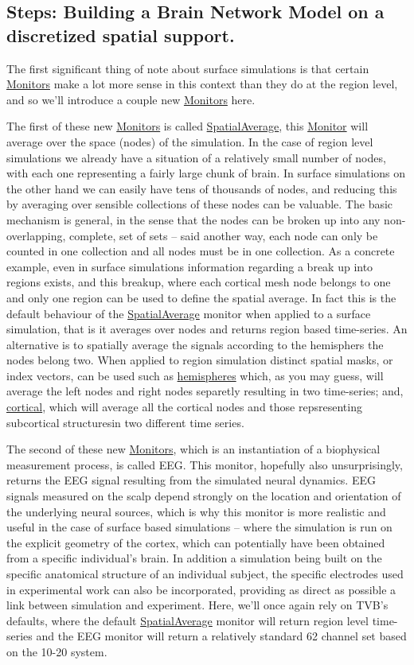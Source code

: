 \documentclass{tufte-handout}
\begin{document}
\subsection{Steps: Building a Brain Network Model on a discretized spatial support.}\label{sec:steps}

The first significant thing of note about surface simulations is that certain \underline{Monitors} make a lot more sense in this context than they do at the region level, and so we'll introduce a couple new \underline{Monitors} here.

The first of these new \underline{Monitors} is called
\underline{SpatialAverage}, this \underline{Monitor} will average over the
space (nodes) of the simulation. In the case of region level simulations we
already have a situation of a relatively small number of nodes, with each one
representing a fairly large chunk of brain. In surface simulations on the
other hand we can easily have tens of thousands of nodes, and reducing this by
averaging over sensible collections of these nodes can be valuable. The basic
mechanism is general, in the sense that the nodes can be broken up into any
non-overlapping, complete, set of sets -- said another way, each node can only
be counted in one collection and all nodes must be in one collection. As a
concrete example, even in surface simulations information regarding a break up
into regions exists, and this breakup, where each cortical mesh node belongs
to one and only one region can be used to define the spatial average. In fact
this is the default behaviour of the \underline{SpatialAverage} monitor when
applied to a surface simulation, that is it averages over nodes and returns
region based time-series. An alternative is to spatially average the signals
according to the hemisphers the nodes belong two.  When applied to region
simulation distinct spatial masks, or index vectors, can be used such as
\underline{hemispheres} which, as you may guess, will average the left nodes
and right nodes separetly resulting in two time-series; and,
\underline{cortical}, which will average all the cortical nodes and those
repsresenting subcortical structuresin two different time series.


The second of these new \underline{Monitors}, which is an instantiation of a
biophysical measurement process, is called EEG. This monitor, hopefully also
unsurprisingly, returns the EEG signal resulting from the simulated neural
dynamics. EEG signals measured on the scalp depend strongly on the location
and orientation of the underlying neural sources, which is why this monitor is
more realistic and useful in the case of surface based simulations -- where
the simulation is run on the explicit geometry of the cortex, which can
potentially have been obtained from a specific individual's brain. In addition
a simulation being built on the specific anatomical structure of an individual
subject, the specific electrodes used in experimental work can also be
incorporated, providing as direct as possible a link between simulation and
experiment. Here, we'll once again rely on TVB's defaults, where the default
\underline{SpatialAverage} monitor will return region level time-series and
the EEG monitor will return a relatively standard 62 channel set based on the
10-20 system.
\end{document}
